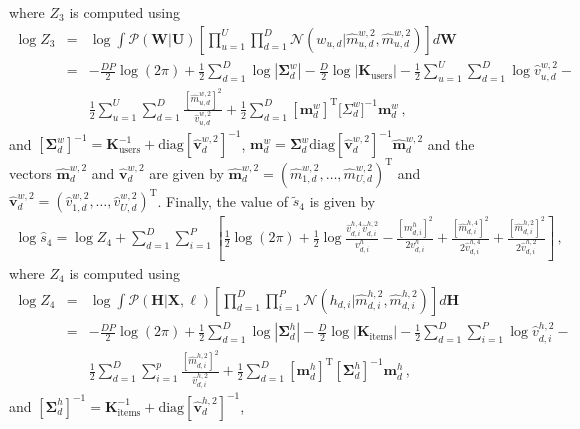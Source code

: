 \documentclass{article}
\begin{document}
where $Z_3$ is computed using
\begin{eqnarray}
\log Z_{3} & = & \log \int \mathcal{P}(\mathbf{W}|\mathbf{U})\left[\prod_{u=1}^{U}\prod_{d=1}^{D}
\mathcal{N}(w_{u,d}|\hat{m}_{u,d}^{w,2},\hat{m}_{u,d}^{w,2})\right]d\mathbf{W}\nonumber\\
& = & -\frac{DP}{2}\log(2\pi) + \frac{1}{2}\sum_{d=1}^D\log|\bm \Sigma_d^w| -
\frac{D}{2}\log|\mathbf{K}_\text{users}| - \frac{1}{2} \sum_{u=1}^U\sum_{d=1}^D \log \hat{v}_{u,d}^{w,2} - \nonumber \\
& & \frac{1}{2} \sum_{u=1}^U\sum_{d=1}^D \frac{[\hat{m}_{u,d}^{w,2}]^2}{\hat{v}_{u,d}^{w,2}} +
\frac{1}{2} \sum_{d=1}^D [\mathbf{m}_d^w]^\text{T} \bm [\Sigma_d^w]^{-1} \mathbf{m}_d^w\,,\label{eq:Z3}
\end{eqnarray}
and $[ \bm \Sigma_d^w]^{-1} = \mathbf{K}^{-1}_\text{users} + \text{diag}[\hat{\mathbf{v}}_d^{w,2}]^{-1}$,
$\mathbf{m}_d^w = \bm \Sigma_d^w \text{diag}[\hat{\mathbf{v}}_d^{w,2}]^{-1} \hat{\mathbf{m}}_d^{w,2}$
and the vectors $\hat{\mathbf{m}}_d^{w,2}$ and $\hat{\mathbf{v}}_d^{w,2}$ are given by
$\hat{\mathbf{m}}_d^{w,2}=(\hat{m}_{1,d}^{w,2},\ldots,\hat{m}_{U,d}^{w,2})^\text{T}$ and
$\hat{\mathbf{v}}_d^{w,2}=(\hat{v}_{1,d}^{w,2},\ldots,\hat{v}_{U,d}^{w,2})^\text{T}$.
Finally, the value of $\tilde{s}_{4}$ is given by
\begin{align}
\log\hat{s}_4 = \log Z_4 + \sum_{d=1}^{D}\sum_{i=1}^{P}\left[
\frac{1}{2}\log(2\pi)+\frac{1}{2}\log \frac{\hat{v}_{d,i}^{h,4} \hat{v}_{d,i}^{h,2}}{v_{d,i}^h}-
\frac{[m_{d,i}^h]^2}{2v_{d,i}^h}+\frac{[\hat{m}_{d,i}^{h,4}]^2}{2\hat{v}_{d,i}^{h,4}}+
\frac{[\hat{m}_{d,i}^{h,2}]^2}{2\hat{v}_{d,i}^{h,2}}\right]\,,
\end{align}
where $Z_4$ is computed using
\begin{eqnarray}
\log Z_{4}  & = & \log \int \mathcal{P}(\mathbf{H}|\mathbf{X},\ell)\left[\prod_{d=1}^{D}\prod_{i=1}^{P}
\mathcal{N}(h_{d,i}|\hat{m}_{d,i}^{h,2},\hat{m}_{d,i}^{h,2})\right]d\mathbf{H}\nonumber\\
& = & -\frac{DP}{2}\log(2\pi) + \frac{1}{2}\sum_{d=1}^D\log|\bm \Sigma_d^h| -
\frac{D}{2}\log|\mathbf{K}_\text{items}| - \frac{1}{2} \sum_{d=1}^D\sum_{i=1}^P \log \hat{v}_{d,i}^{h,2} - \nonumber \\
& & \frac{1}{2} \sum_{d=1}^D\sum_{i=1}^p \frac{[\hat{m}_{d,i}^{h,2}]^2}{\hat{v}_{d,i}^{h,2}} +
\frac{1}{2} \sum_{d=1}^D [\mathbf{m}_d^h]^\text{T} [\bm \Sigma_d^h]^{-1} \mathbf{m}_d^h\,,\label{eq:Z4}
\end{eqnarray}
and $[\bm \Sigma_d^h]^{-1} = \mathbf{K}^{-1}_\text{items} + \text{diag}[\hat{\mathbf{v}}_d^{h,2}]^{-1}$,
\end{document}
